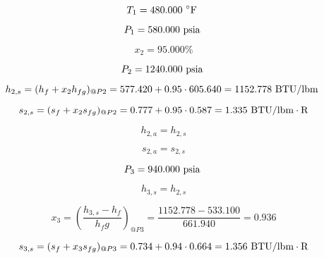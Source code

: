 \documentclass{article}
\begin{document}
\begin{equation}
T_{ 1} =  480.000\textnormal{ \(^{\circ}\)F             }
\end{equation}

\begin{equation}
P_{ 1} =  580.000\textnormal{ psia                      }
\end{equation}

\begin{equation}
x_{ 2} =   95.000\%
\end{equation}

\begin{equation}
P_{ 2} = 1240.000\textnormal{ psia                      }
\end{equation}

\begin{equation}
  h_{ 2,s} = (h_{f} + x_{ 2}h_{fg})_{@P 2} =  577.420 + 0.95\cdot 605.640 = 1152.778
\textnormal{ BTU/lbm                   }
\end{equation}

\begin{equation}
  s_{ 2,s} = (s_{f} + x_{ 2}s_{fg})_{@P 2} =    0.777 + 0.95\cdot   0.587 =    1.335
\textnormal{ BTU/lbm}\cdot\textnormal{R}
\end{equation}

\begin{equation}
h_{ 2,a} = h_{ 2,s}
\end{equation}

\begin{equation}
s_{ 2,a} = s_{ 2,s}
\end{equation}

\begin{equation}
P_{ 3} =  940.000\textnormal{ psia                      }
\end{equation}

\begin{equation}
h_{ 3,s} = h_{ 2,s}
\end{equation}

\begin{equation}
x_{ 3} = (\frac{h_{ 3,s} - h_{f}}{h_fg})_{@P 3} = \frac{1152.778 -  533.100}{ 661.940} =    0.936
\end{equation}

\begin{equation}
  s_{ 3,s} = (s_{f} + x_{ 3}s_{fg})_{@P 3} =    0.734 + 0.94\cdot   0.664 =    1.356
\textnormal{ BTU/lbm}\cdot\textnormal{R}
\end{equation}
\end{document}

